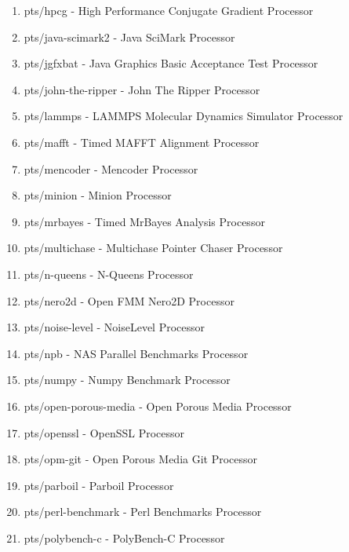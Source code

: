 \documentclass[french]{article}
\begin{document}
\begin{enumerate}
\item pts/hpcg                       - High Performance Conjugate Gradient Processor
\item pts/java-scimark2              - Java SciMark                        Processor
\item pts/jgfxbat                    - Java Graphics Basic Acceptance Test Processor
\item pts/john-the-ripper            - John The Ripper                     Processor
\item pts/lammps                     - LAMMPS Molecular Dynamics Simulator Processor
\item pts/mafft                      - Timed MAFFT Alignment               Processor
\item pts/mencoder                   - Mencoder                            Processor
\item pts/minion                     - Minion                              Processor
\item pts/mrbayes                    - Timed MrBayes Analysis              Processor
\item pts/multichase                 - Multichase Pointer Chaser           Processor
\item pts/n-queens                   - N-Queens                            Processor
\item pts/nero2d                     - Open FMM Nero2D                     Processor
\item pts/noise-level                - NoiseLevel                          Processor
\item pts/npb                        - NAS Parallel Benchmarks             Processor
\item pts/numpy                      - Numpy Benchmark                     Processor
\item pts/open-porous-media          - Open Porous Media                   Processor
\item pts/openssl                    - OpenSSL                             Processor
\item pts/opm-git                    - Open Porous Media Git               Processor
\item pts/parboil                    - Parboil                             Processor
\item pts/perl-benchmark             - Perl Benchmarks                     Processor
\item pts/polybench-c                - PolyBench-C                         Processor

\end{enumerate}
\end{document}
